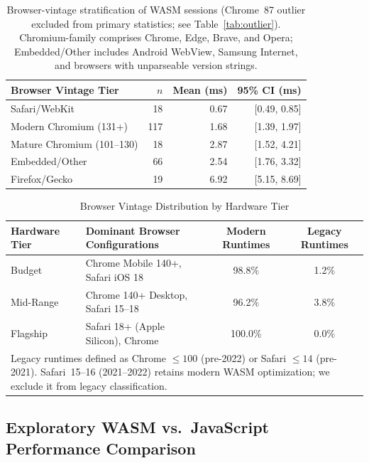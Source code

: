 \documentclass[11pt,a4paper]{article}
\def\textbf#1{#1}%
\begin{document}
\begin{table}[htbp]
\centering
\caption{Browser-vintage stratification of WASM sessions (Chrome~87 outlier excluded from primary statistics; see Table~\ref{tab:outlier}). Chromium-family comprises Chrome, Edge, Brave, and Opera; Embedded/Other includes Android WebView, Samsung Internet, and browsers with unparseable version strings.}
\label{tab:vintage-strat}
\begin{tabular}{@{}lrrr@{}}
\toprule
\textbf{Browser Vintage Tier} & \textbf{$n$} & \textbf{Mean (ms)} & \textbf{95\% CI (ms)} \\
\midrule
Safari/WebKit & 18 & 0.67 & [0.49, 0.85] \\
Modern Chromium (131+) & 117 & 1.68 & [1.39, 1.97] \\
Mature Chromium (101--130) & 18 & 2.87 & [1.52, 4.21] \\
Embedded/Other & 66 & 2.54 & [1.76, 3.32] \\
Firefox/Gecko & 19 & 6.92 & [5.15, 8.69] \\
\bottomrule
\end{tabular}
\end{table}

\begin{table}[htbp]
\centering
\caption{Browser Vintage Distribution by Hardware Tier}
\label{tab:browser-vintage}
\begin{tabular}{@{}llcc@{}}
\toprule
\textbf{Hardware Tier} & \textbf{Dominant Browser Configurations} & \textbf{Modern Runtimes} & \textbf{Legacy Runtimes} \\
\midrule
Budget      & Chrome Mobile 140+, Safari iOS 18  & 98.8\% & 1.2\% \\
Mid-Range   & Chrome 140+ Desktop, Safari 15--18 & 96.2\% & 3.8\% \\
Flagship    & Safari 18+ (Apple Silicon), Chrome & 100.0\% & 0.0\% \\
\bottomrule
\multicolumn{4}{l}{\footnotesize{Legacy runtimes defined as Chrome $\leq100$ (pre-2022) or Safari $\leq14$ (pre-2021). Safari~15--16 (2021--2022) retains modern WASM optimization; we exclude it from legacy classification.}}
\end{tabular}
\end{table}

\subsection{Exploratory WASM vs.\ JavaScript Performance Comparison}
\label{subsec:wasm-vs-js}
\end{document}
